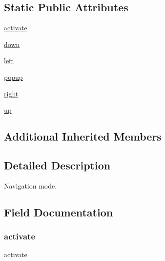 \subsection*{Static Public Attributes}
\begin{DoxyCompactItemize}
\item 
\hyperlink{classvlc_1_1_navigate_mode_a7f39ee7510f973f6462e717d341388db}{activate}
\item 
\hyperlink{classvlc_1_1_navigate_mode_ab9370d5bdd3afdddb6a8ff001a09c0c4}{down}
\item 
\hyperlink{classvlc_1_1_navigate_mode_a58c76f848f15df202254c1daec468567}{left}
\item 
\hyperlink{classvlc_1_1_navigate_mode_add84d0ed4321d9c54dae5b8be84ab605}{popup}
\item 
\hyperlink{classvlc_1_1_navigate_mode_a25331d5f9601b8cb1ce57490930d7c01}{right}
\item 
\hyperlink{classvlc_1_1_navigate_mode_a1df03026db3aa663afda0c9eed67408e}{up}
\end{DoxyCompactItemize}
\subsection*{Additional Inherited Members}


\subsection{Detailed Description}
\begin{DoxyVerb}Navigation mode.
\end{DoxyVerb}
 

\subsection{Field Documentation}
\mbox{\label{classvlc_1_1_navigate_mode_a7f39ee7510f973f6462e717d341388db}} 
\subsubsection{\texorpdfstring{activate}{activate}}
{\footnotesize\ttfamily activate\hspace{0.3cm}{\ttfamily [static]}}

\mbox{\label{classvlc_1_1_navigate_mode_ab9370d5bdd3afdddb6a8ff001a09c0c4}} 
